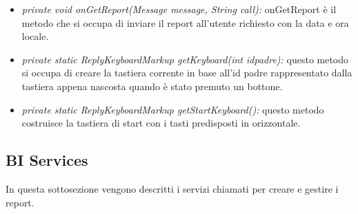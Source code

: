 \begin{itemize}
 \item \textit{private void onGetReport(Message message, String call):}
onGetReport è il metodo che si occupa di inviare il report all’utente richiesto con la data e ora locale.

\item \textit{private static ReplyKeyboardMarkup getKeyboard(int idpadre):}
questo metodo si occupa di creare la tastiera corrente in base all'id padre rappresentato dalla tastiera appena nascosta quando è stato premuto un bottone. 

\item \textit{private static ReplyKeyboardMarkup getStartKeyboard():}
questo metodo costruisce la tastiera di start con i tasti predisposti in orizzontale.

\end{itemize}

\subsection{BI Services}

In questa sottosezione vengono descritti i servizi chiamati per creare e gestire i report. \\


